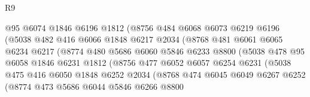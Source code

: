 \begin{lexlean}{R9}
\begin{coremodule}
                          @95
                          @6074
                          @1846
                          @6196
                          @1812
                          (@8756
                            @484
                            @6068
                            @6073
                            @6219
                            @6196
                            (@5038
                              @482
                              @416
                              @6066
                              @1848
                              @6217
                              @2034
                              (@8768
                                @481
                                @6061
                                @6065
                                @6234
                                @6217
                                (@8774
                                  @480
                                  @5686
                                  @6060
                                  @5846
                                  @6233
                                  @8800
                                  (@5038
                                    @478
                                    @95
                                    @6058
                                    @1846
                                    @6231
                                    @1812
                                    (@8756
                                      @477
                                      @6052
                                      @6057
                                      @6254
                                      @6231
                                      (@5038
                                        @475
                                        @416
                                        @6050
                                        @1848
                                        @6252
                                        @2034
                                        (@8768
                                          @474
                                          @6045
                                          @6049
                                          @6267
                                          @6252
                                          (@8774
                                            @473
                                            @5686
                                            @6044
                                            @5846
                                            @6266
                                            @8800

\end{coremodule}
\end{lexlean}
